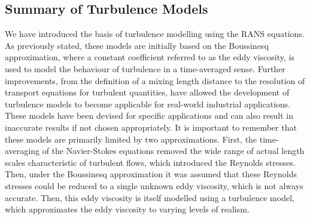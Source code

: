 \subsection{Summary of Turbulence Models}
We have introduced the basis of turbulence modelling using the RANS equations. As previously stated, these models are initially based on the Boussinesq approximation, where a constant coefficient referred to as the eddy viscosity, is used to model the behaviour of turbulence in a time-averaged sense. Further improvements, from the definition of a mixing length distance to the resolution of transport equations for turbulent quantities, have allowed the development of turbulence models to become applicable for real-world industrial applications. These models have been devised for specific applications and can also result in inaccurate results if not chosen appropriately. It is important to remember that these models are primarily limited by two approximations. First, the time-averaging of the Navier-Stokes equations removed the wide range of actual length scales characteristic of turbulent flows, which introduced the Reynolds stresses. Then, under the Boussinesq approximation it was assumed that these Reynolds stresses could be reduced to a single unknown eddy viscosity, which is not always accurate. Then, this eddy viscosity is itself modelled using a turbulence model, which approximates the eddy viscosity to varying levels of realism.

